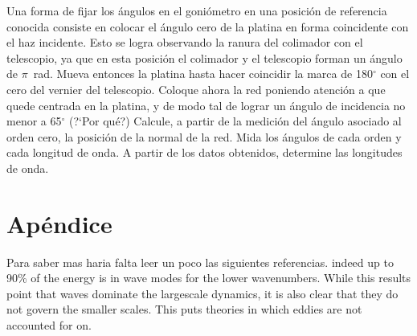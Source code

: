 \documentclass[laboratorio]{guia}
\begin{document}
Una forma de fijar los \'angulos en el goni\'ometro en una posici\'on de 
referencia conocida consiste en colocar el \'angulo cero de la platina en 
forma coincidente con el haz incidente. Esto se logra observando la ranura
del colimador con el telescopio, ya que en esta posici\'on el colimador
y el telescopio forman un \'angulo de $\pi$~rad. Mueva entonces la platina
hasta hacer coincidir la marca de 180$^\circ$ con el cero del vernier del
telescopio. Coloque ahora la red poniendo atenci\'on a que quede centrada en
la platina, y de modo tal de lograr un \'angulo de incidencia no menor a 
65$^\circ$ (?`Por qu\'e?) Calcule, a partir de la medici\'on del \'angulo 
asociado al orden cero, la posici\'on de la normal de la red. Mida los 
\'angulos de cada orden y cada longitud de onda. A partir de los datos 
obtenidos, determine las longitudes de onda. 







\section*{Ap\'endice}








        
\begin{sabermas}
Para saber mas haria falta leer un poco las siguientes referencias.
indeed up to 90\% of the energy is in wave modes for the lower
wavenumbers. While this results point that waves dominate the largescale
dynamics, it is also clear that they do not govern the smaller scales.
This puts theories in which eddies are not accounted for on.
\end{sabermas}

% 
% 
\end{document}

